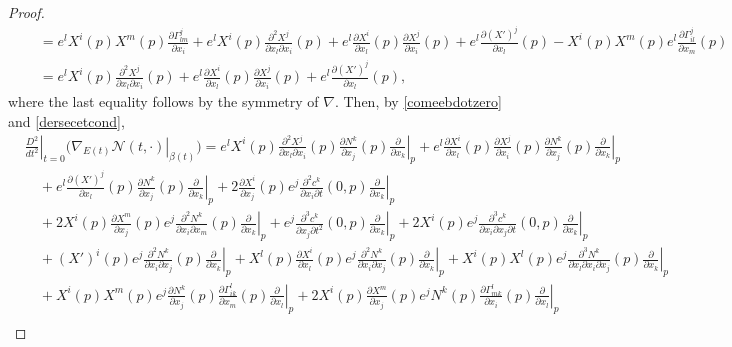\documentclass[11pt]{amsart}
\newcommand{\N}{\mathcal N}
\theoremstyle{definition}
\theoremstyle{remark}
\numberwithin{equation}{section}
\begin{document}
\begin{proof}
\begin{equation}
\begin{split}
              &\quad=e^lX^i(p)X^m(p)\frac{\partial\Gamma_{lm}^j}{\partial x_i}+ e^l X^i(p)\frac{\partial^2 X^j}{\partial x_l \partial x_i}(p)+e^l\frac{\partial X^i}{\partial x_l}(p)\frac{\partial X^j}{\partial x_i}(p)+e^l\frac{\partial (X')^j}{\partial x_l}(p)-X^i(p)X^m(p)e^l\frac{\partial\Gamma_{il}^j}{\partial x_m}(p)\\
              &\quad= e^l X^i(p)\frac{\partial^2 X^j}{\partial x_l \partial x_i}(p)+e^l\frac{\partial X^i}{\partial x_l}(p)\frac{\partial X^j}{\partial x_i}(p)+e^l\frac{\partial (X')^j}{\partial x_l}(p),
       \end{split}
       \end{equation}
       where the last equality follows by the symmetry of $\nabla$. 
 Then, by  \eqref{comeebdotzero} and \eqref{dersecetcond},
    \begin{equation*}
        \begin{split}
             &\left.\frac{D^2}{dt^2}\right|_{t=0}\Big(\left.\nabla_{E(t)}\N(t,\cdot)\right|_{\beta(t)}\Big)=e^l X^i(p)\frac{\partial^2 X^j}{\partial x_l \partial x_i}(p)\frac{\partial N^k}{\partial x_j}(p)\left.\frac{\partial}{\partial x_k}\right|_{p}+e^l\frac{\partial X^i}{\partial x_l}(p)\frac{\partial X^j}{\partial x_i}(p)\frac{\partial N^k}{\partial x_j}(p)\left.\frac{\partial}{\partial x_k}\right|_{p}\\
             &\quad+e^l\frac{\partial (X')^j}{\partial x_l}(p)\frac{\partial N^k}{\partial x_j}(p)\left.\frac{\partial}{\partial x_k}\right|_{p}+2\frac{\partial X^i}{\partial x_j}(p)e^j\frac{\partial^2 c^k}{\partial x_i\partial t}(0,p)\left.\frac{\partial}{\partial x_k}\right|_{p}\\
             &\quad+2X^i(p)\frac{\partial X^m}{\partial x_j}(p)e^j\frac{\partial^2 N^k}{\partial x_i\partial x_m}(p)\left.\frac{\partial}{\partial x_k}\right|_{p}+e^j\frac{\partial^3 c^k}{\partial x_j\partial t^2}(0,p)\left.\frac{\partial}{\partial x_k}\right|_{p}+2X^i(p)e^j\frac{\partial^3 c^k}{\partial x_i\partial x_j\partial t}(0,p)\left.\frac{\partial}{\partial x_k}\right|_{p}\\
             &\quad +(X')^i(p)e^j\frac{\partial ^2N^k}{\partial x_i\partial x_j}(p)\left.\frac{\partial}{\partial x_k}\right|_{p}+X^l(p)\frac{\partial X^i}{\partial x_l}(p)e^j\frac{\partial ^2N^k}{\partial x_i\partial x_j}(p)\left.\frac{\partial}{\partial x_k}\right|_{p}+X^i(p)X^l(p)e^j\frac{\partial ^3N^k}{\partial x_l\partial x_i\partial x_j}(p)\left.\frac{\partial}{\partial x_k}\right|_{p}\\
             &\quad+X^i(p)X^m(p) e^j\frac{\partial N^k}{\partial x_j}(p)\frac{\partial \Gamma_{ik}^l}{\partial x_m}(p)\left.\frac{\partial}{\partial x_l}\right|_{p}+2X^i(p)\frac{\partial X^m}{\partial x_j}(p)e^jN^k(p)\frac{\partial \Gamma_{mk}^l}{\partial x_i}(p)\left.\frac{\partial}{\partial x_l}\right|_{p}\\

\end{split}
\end{equation*}
\end{proof}
\end{document}
